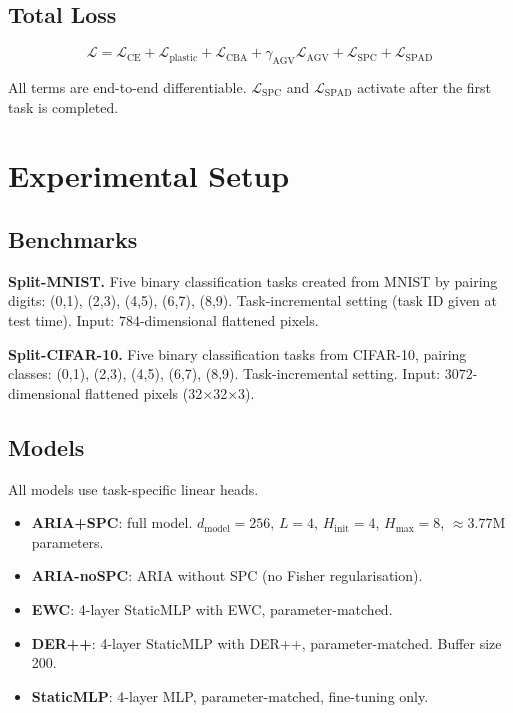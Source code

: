 \documentclass[10pt,twocolumn]{article}
\begin{document}
\subsection{Total Loss}

\begin{equation}
  \mathcal{L} = \mathcal{L}_{\mathrm{CE}} + \mathcal{L}_{\mathrm{plastic}} + \mathcal{L}_{\mathrm{CBA}} + \gamma_{\mathrm{AGV}} \mathcal{L}_{\mathrm{AGV}} + \mathcal{L}_{\mathrm{SPC}} + \mathcal{L}_{\mathrm{SPAD}}
\end{equation}

All terms are end-to-end differentiable. $\mathcal{L}_{\mathrm{SPC}}$ and $\mathcal{L}_{\mathrm{SPAD}}$ activate after the first task is completed.

\section{Experimental Setup}
\label{sec:experiments}

\subsection{Benchmarks}

\textbf{Split-MNIST.} Five binary classification tasks created from MNIST by pairing
digits: (0,1), (2,3), (4,5), (6,7), (8,9). Task-incremental setting (task ID given
at test time). Input: $784$-dimensional flattened pixels.

\textbf{Split-CIFAR-10.} Five binary classification tasks from CIFAR-10, pairing
classes: (0,1), (2,3), (4,5), (6,7), (8,9). Task-incremental setting. Input:
$3072$-dimensional flattened pixels (32$\times$32$\times$3).

\subsection{Models}

All models use task-specific linear heads.

\begin{itemize}
  \item \textbf{ARIA+SPC}: full model. $d_{\mathrm{model}}=256$, $L=4$,
    $H_{\mathrm{init}}=4$, $H_{\max}=8$, $\approx 3.77$M parameters.
  \item \textbf{ARIA-noSPC}: ARIA without SPC (no Fisher regularisation).
  \item \textbf{EWC}: 4-layer StaticMLP with EWC, parameter-matched.
  \item \textbf{DER++}: 4-layer StaticMLP with DER++, parameter-matched. Buffer size 200.
  \item \textbf{StaticMLP}: 4-layer MLP, parameter-matched, fine-tuning only.
\end{itemize}
\end{document}
